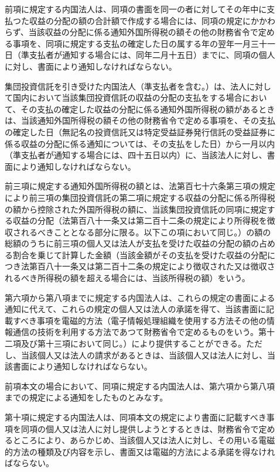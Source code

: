\documentclass[twocolumn,a4j,10pt]{ltjtarticle}
\begin{document}
\begin{description}
\item[]前項に規定する内国法人は、同項の書面を同一の者に対してその年中に支払つた収益の分配の額の合計額で作成する場合には、同項の規定にかかわらず、当該収益の分配に係る通知外国所得税の額その他の財務省令で定める事項を、同項に規定する支払の確定した日の属する年の翌年一月三十一日（準支払者が通知する場合には、同年二月十五日）までに、同項の個人に対し、書面により通知しなければならない。
\item[]集団投資信託を引き受けた内国法人（準支払者を含む。）は、法人に対して国内において当該集団投資信託の収益の分配の支払をする場合において、その支払の確定した収益の分配に係る通知外国所得税の額があるときは、当該通知外国所得税の額その他の財務省令で定める事項を、その支払の確定した日（無記名の投資信託又は特定受益証券発行信託の受益証券に係る収益の分配に係る通知については、その支払をした日）から一月以内（準支払者が通知する場合には、四十五日以内）に、当該法人に対し、書面により通知しなければならない。
\item[]前三項に規定する通知外国所得税の額とは、法第百七十六条第三項の規定により前三項の集団投資信託の第二項に規定する収益の分配に係る所得税の額から控除された外国所得税の額に、当該集団投資信託の同項に規定する収益の分配（法第百八十一条又は第二百十二条の規定により所得税を徴収されるべきこととなる部分に限る。以下この項において同じ。）の額の総額のうちに前三項の個人又は法人が支払を受けた収益の分配の額の占める割合を乗じて計算した金額（当該金額がその支払を受けた収益の分配につき法第百八十一条又は第二百十二条の規定により徴収された又は徴収されるべき所得税の額を超える場合には、当該所得税の額）をいう。
\item[]第六項から第八項までに規定する内国法人は、これらの規定の書面による通知に代えて、これらの規定の個人又は法人の承諾を得て、当該書面に記載すべき事項を電磁的方法（電子情報処理組織を使用する方法その他の情報通信の技術を利用する方法であつて財務省令で定めるものをいう。第十二項及び第十三項において同じ。）により提供することができる。ただし、当該個人又は法人の請求があるときは、当該個人又は法人に対し、当該書面により通知しなければならない。
\item[]前項本文の場合において、同項に規定する内国法人は、第六項から第八項までの規定による通知をしたものとみなす。
\item[]第十項に規定する内国法人は、同項本文の規定により書面に記載すべき事項を同項の個人又は法人に対し提供しようとするときは、財務省令で定めるところにより、あらかじめ、当該個人又は法人に対し、その用いる電磁的方法の種類及び内容を示し、書面又は電磁的方法による承諾を得なければならない。

\end{description}
\end{document}
